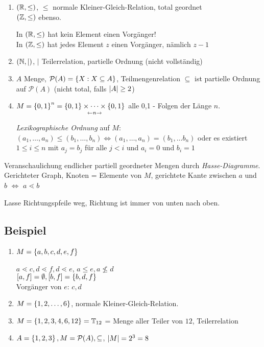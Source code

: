  \begin{enumerate}
	 
	 \item $(\operatorname{\mathbb{R}}, \leq)$, $\leq$ normale Kleiner-Gleich-Relation, total geordnet
	 \\ $(\operatorname{\mathbb{Z}}, \leq)$ ebenso. 
	 
	 In $(\operatorname{\mathbb{R}}, \leq)$ hat kein Element einen Vorgänger! 
	 \\In $(\operatorname{\mathbb{Z}}, \leq)$ hat jedes Element $z$ einen Vorgänger, nämlich $z-1$
	 
	 \item $(\operatorname{\mathbb{N}}, |)$, $|$ Teilerrelation, partielle Ordnung (nicht vollständig)
	 
	 \item $A$ Menge, $\mathcal{P}(A) = \left\{X : X \subseteq A\right\}$, Teilmengenrelation $\subseteq$ ist partielle Ordnung auf $\mathcal{P}(A)$ (nicht total, falls $\left|A\right| \geq 2$)

	 \item $M = \left\{0, 1\right\}^n = \underset{\leftarrow n \rightarrow}{\left\{0,1\right\} \times \dots \times \left\{0,1\right\}}$ alle 0,1 - Folgen der Länge $n$.
	 
	 \emph{Lexikographische Ordnung} auf $M$: 
	 \\ $(a_1, \dots, a_n) \leq (b_1, \dots, b_n) \Leftrightarrow (a_1, \dots, a_n) = (b_1, \dots b_n)$
	 oder es existiert $1 \leq i \leq n$ mit $a_j = b_j$ für alle $j < i$ und $a_i = 0$ und $b_i = 1$ 
	 
 \end{enumerate}

Veranschaulichung endlicher partiell geordneter Mengen durch \emph{Hasse-Diagramme}.
Gerichteter Graph, Knoten = Elemente von $M$, gerichtete Kante zwischen $a$ und $b$ $\Leftrightarrow$ $a\lessdot b$

Lasse Richtungspfeile weg, Richtung ist immer von unten nach oben. 

\subsection{Beispiel} %
\begin{enumerate}
	\item $M = \left\{a, b, c, d, e, f\right\}$
	
	$a \lessdot c, d \lessdot f, d \lessdot e$,
	$a \leq e, a \nleq d$
	\\ $[a, f] = \emptyset, [b, f] = \left\{b, d, f\right\}$
	\\ Vorgänger von $e$: $c,d$
	
	\item $M = \left\{1, 2, \dots, 6\right\}$, normale Kleiner-Gleich-Relation.
	
	\item $M = \left\{1, 2, 3, 4, 6, 12\right\} = \mathbb{T}_{12}$ = Menge aller Teiler von $12$, Teilerrelation
	
	\item $A = \left\{1, 2, 3\right\}, M = \mathcal{P}(A), \subseteq$, $\left|M\right| = 2^3 = 8$
	
\end{enumerate} 

